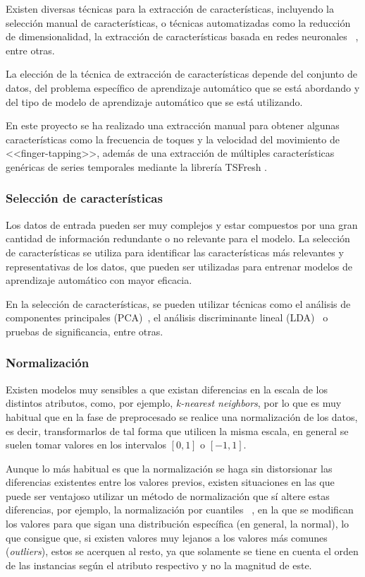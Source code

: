 Existen diversas técnicas para la extracción de características, incluyendo la
selección manual de características, o técnicas automatizadas como la reducción
de dimensionalidad, la extracción de características basada en redes neuronales
~\cite{intrator1991feature}, entre otras.

La elección de la técnica de extracción de características depende del conjunto
de datos, del problema específico de aprendizaje automático que se está
abordando y del tipo de modelo de aprendizaje automático que se está utilizando.

En este proyecto se ha realizado una extracción manual para obtener algunas
características como la frecuencia de toques y la velocidad del movimiento de
<<finger-tapping>>, además de una extracción de múltiples características
genéricas de series temporales mediante la librería TSFresh
\cite{christ2018time}.

\subsubsection{Selección de características}

Los datos de entrada pueden ser muy complejos y estar compuestos por una gran
cantidad de información redundante o no relevante para el modelo. La selección
de características se utiliza para identificar  las características más
relevantes y representativas de los datos, que pueden ser utilizadas para
entrenar modelos de aprendizaje automático con mayor eficacia.

En la selección de características, se pueden utilizar técnicas como el análisis
de componentes principales (PCA)~\cite{mackiewicz1993principal}, el análisis
discriminante lineal (LDA)~\cite{xanthopoulos2013linear} o pruebas de
significancia, entre otras.

\subsubsection{Normalización}

Existen modelos muy sensibles a que existan diferencias en la escala de los
distintos atributos, como, por ejemplo, \textit{k-nearest neighbors}, por lo que
es muy habitual que en la fase de preprocesado se realice una normalización de
los datos, es decir, transformarlos de tal forma que utilicen la misma escala,
en general se suelen tomar valores en los intervalos $[0, 1]$ o $[-1, 1]$.

Aunque lo más habitual es que la normalización se haga sin distorsionar las
diferencias existentes entre los valores previos, existen situaciones en las que
puede ser ventajoso utilizar un método de normalización que sí altere estas
diferencias, por ejemplo, la normalización por cuantiles
~\cite{enwiki:1138433182}, en la que se modifican los valores para que sigan una
distribución específica (en general, la normal), lo que consigue que, si existen
valores muy lejanos a los valores más comunes (\textit{outliers}), estos se
acerquen al resto, ya que solamente se tiene en cuenta el orden de las
instancias según el atributo respectivo y no la magnitud de este.

